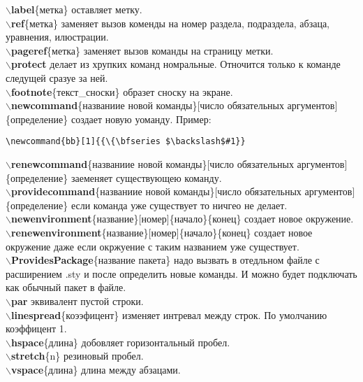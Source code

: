 \documentclass{article}
\newcommand{\bb}[1]{{\bfseries $\backslash$#1}} %
\begin{document}
\bb{label}\{метка\} оставляет метку.\\
\bb{ref}\{метка\} заменяет вызов коменды на номер раздела, подраздела, абзаца, уравнения, илюстрации.\\
\bb{pageref}\{метка\} заменяет вызов команды на страницу метки.\\

\bb{protect} делает из хрупких команд номральные. Отночится только к команде следущей сразуе за ней.\\

\bb{footnote}\{текст\_сноски\} образет сноску на экране.\\

\bb{newcommand}\{названиие новой команды\}[число обязательных аргументов]\{определение\} создает новую уоманду. Пример:
\begin{verbatim}
\newcommand{bb}[1]{{\{\bfseries $\backslash$#1}}
\end{verbatim} 
\bb{renewcommand}\{названиие новой команды\}[число обязательных аргументов]\{определение\} заеменяет существующею команду.\\
\bb{providecommand}\{названиие новой команды\}[число обязательных аргументов]\{определение\} если команда уже существует то ничгео не делает.\\

\bb{newenvironment}\{название\}[номер]\{начало\}\{конец\} создает новое окружение.\\
\bb{renewenvironment}\{название\}[номер]\{начало\}\{конец\} создает новое окружение даже если окржуение с таким названием уже существует.\\

\bb{ProvidesPackage}\{название пакета\} надо вызвать в отедльном файле с расширением .sty и после определить новые команды. И можно будет подключать как обычный пакет в файле.\\

\bb{par} эквивалент пустой строки.\\

\bb{linespread}\{коээфицент\} изменяет интревал между строк. По умолчанию коэффицент 1.\\
\bb{hspace}\{длина\} добовляет горизонтальный пробел.\\
\bb{stretch}\{n\} резиновый пробел.\\
\bb{vspace}\{длина\} длина между абзацами.\\
\end{document}
